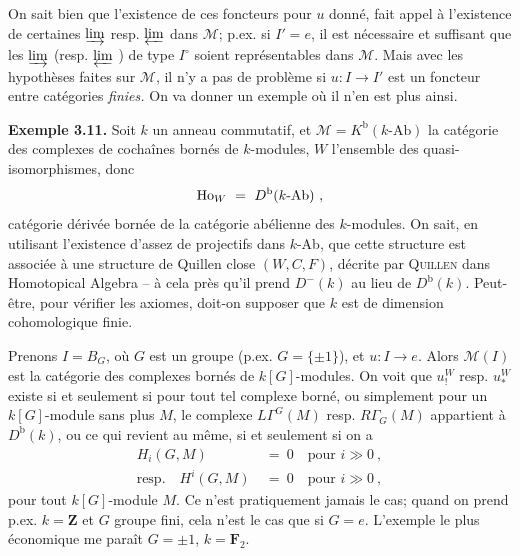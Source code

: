 On sait bien que l'existence de ces foncteurs pour $u$ donné, fait appel à l'existence de certaines $\varinjlim$ resp. $\varprojlim$ dans $\mathcal{M}$; p.ex. si $I'=e$, il est nécessaire et suffisant que les $\varinjlim$ (resp. $\varprojlim$ ) de type $I^\circ$ soient représentables dans $\mathcal{M}$. Mais avec les hypothèses faites sur $\mathcal{M}$, il n'y a pas de problème si $u : I \longrightarrow I'$ est un foncteur entre catégories \textit{finies.} On va donner un exemple où il n'en est plus ainsi.

\textbf{Exemple 3.11.} Soit $k$ un anneau commutatif, et $\mathcal{M}=K^{\mathrm{b}}(k\text{-Ab})$ la catégorie des complexes de cochaînes bornés de $k$-modules, $W$ l'ensemble des quasi-isomorphismes, donc
\[
\Ho_W \ = \ D^{\mathrm{b}}(k\text{-Ab}) \ ,
\]
catégorie dérivée bornée de la catégorie abélienne des $k$-modules. On sait, en utilisant l'existence d'assez de projectifs dans $k$-Ab, que cette structure est associée à une structure de Quillen close $(W,C,F)$, décrite par \textsc{Quillen}
dans Homotopical Algebra -- à cela près qu'il prend $D^-(k)$ au lieu de $D^{\mathrm{b}}(k)$. Peut-être, pour vérifier les axiomes, doit-on supposer que $k$ est de dimension cohomologique finie.

Prenons $I=B_G$, où $G$ est un groupe (p.ex. $G=\{\pm1\}$), et $u : I \longrightarrow e$. Alors $\mathcal{M}(I)$ est la catégorie des complexes bornés de $k[G]$-modules. On voit que $u_!^W$ resp. $u_*^W$ existe si et seulement si pour tout tel complexe borné, ou simplement pour un $k[G]$-module sans plus $M$, le complexe $L\Gamma^G(M)$ resp. $R\Gamma_G(M)$ appartient à $D^{\mathrm{b}}(k)$, ou ce qui revient au même,
si et seulement si on a
\[
\begin{aligned}
H_i(G,M) \ &= \ 0 \quad \text{pour } i \gg 0 \ ,\\
\text{resp.}\quad H^i(G,M) \ &= \ 0 \quad \text{pour } i \gg 0 \ ,
\end{aligned}
\]
pour tout $k[G]$-module $M$. Ce n'est pratiquement jamais le cas; quand on prend p.ex. $k=\mathbf{Z}$ et $G$ groupe fini, cela n'est le cas que si $G=e$. L'exemple le plus économique me paraît $G=\pm1$, $k=\mathbf{F}_2$.

